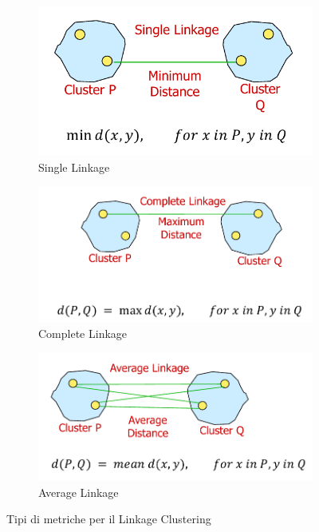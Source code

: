 \begin{figure}[h]
\centering
\begin{subfigure}[b]{0.8\textwidth}
\centering
\includegraphics[width=\textwidth]{img/chapter-3/single-linkage.png}
\caption{Single Linkage}\label{img:single-linkage}
\end{subfigure}

\hfill

\begin{subfigure}[b]{0.8\textwidth}
\centering
\includegraphics[width=\textwidth]{img/chapter-3/complete-linkage.png}
\caption{Complete Linkage}\label{img:complete-linkage}
\end{subfigure}

\hfill
\begin{subfigure}[b]{0.8\textwidth}
\centering
\includegraphics[width=\textwidth]{img/chapter-3/average-linkage.png}
\caption{Average Linkage}\label{img:average-linkage}
\end{subfigure}

\caption{Tipi di metriche per il Linkage Clustering}
\end{figure}

